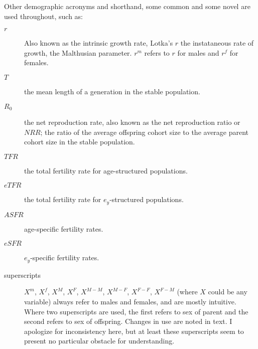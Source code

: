 Other demographic acronyms and shorthand, some common and some novel are used
throughout, such as:
\begin{description}
  \item[$r$] Also known as the intrinsic growth rate, Lotka's $r$ the
  instataneous rate of growth, the Malthusian parameter. $r^m$ refers to $r$ for
  males and $r^f$ for females.
  \item [$T$] the mean length of a generation in the stable population.
  \item [$R_0$] the net reproduction rate, also known as the net reproduction
  ratio or $NRR$; the ratio of the average offspring cohort size to the average
  parent cohort size in the stable population.
  \item [$TFR$] the total fertility rate for age-structured populations.
  \item [$eTFR$] the total fertility rate for $e_y$-structured populations.
  \item [$ASFR$] age-specific fertility rates.
  \item [$eSFR$] $e_y$-specific fertility rates.
  \item [superscripts] ${X}^m$, ${X}^f$, ${X}^M$, ${X}^F$, ${X}^{M-M}$,
  ${X}^{M-F}$, ${X}^{F-F}$, ${X}^{F-M}$ (where $X$ could be any variable) always
  refer to males and females, and are mostly intuitive. Where two
  superscripts are used, the first refers to sex of parent and the second
  refers to sex of offspring. Changes in use are noted in text. I apologize for
  inconsistency here, but at least these superscripts seem to present no
  particular obstacle for understanding.
\end{description}
